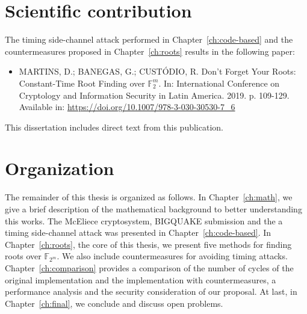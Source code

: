 \section{Scientific contribution}
The timing side-channel attack performed in Chapter~\ref{ch:code-based} and the countermeasures proposed in Chapter~\ref{ch:roots} results in the following paper:

\begin{itemize}
    \item  MARTINS, D.; BANEGAS, G.; CUSTÓDIO, R. Don’t Forget Your Roots: Constant-Time Root Finding over $\mathbb{F}_2^m$. In: International Conference on Cryptology and Information Security in Latin America.  2019. p. 109-129. Available in: \url{https://doi.org/10.1007/978-3-030-30530-7_6}
\end{itemize}

This dissertation includes direct text from this publication.

\section{Organization}
The remainder of this thesis is organized as follows. In Chapter~\ref{ch:math}, we give a brief description of the mathematical background to better understanding this works. The McEliece cryptosystem, BIGQUAKE submission and the a timing side-channel attack was presented in Chapter~\ref{ch:code-based}. In Chapter~\ref{ch:roots}, the core of this thesis, we present five methods for finding roots over $\mathbb{F}_{2^m}$. We also include countermeasures for avoiding timing attacks. Chapter~\ref{ch:comparison} provides a comparison of the number of cycles of the original implementation and the implementation with countermeasures, a performance analysis and the security consideration of our proposal. At last, in Chapter~\ref{ch:final}, we conclude and discuss open problems.
















